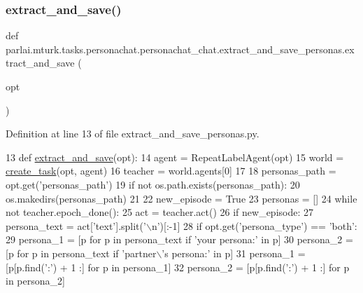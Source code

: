 \subsubsection{\texorpdfstring{extract\+\_\+and\+\_\+save()}{extract\_and\_save()}}
{\footnotesize\ttfamily def parlai.\+mturk.\+tasks.\+personachat.\+personachat\+\_\+chat.\+extract\+\_\+and\+\_\+save\+\_\+personas.\+extract\+\_\+and\+\_\+save (\begin{DoxyParamCaption}\item[{}]{opt }\end{DoxyParamCaption})}



Definition at line 13 of file extract\+\_\+and\+\_\+save\+\_\+personas.\+py.


\begin{DoxyCode}
13 \textcolor{keyword}{def }\hyperlink{namespacepersonachat__eval_1_1extract__and__save__personas_a7bae99c34a0b3f49cbce1328146926fd}{extract\_and\_save}(opt):
14     agent = RepeatLabelAgent(opt)
15     world = \hyperlink{namespaceparlai_1_1core_1_1worlds_a11923c10b545c7ecc1b08fe2242d9c2c}{create\_task}(opt, agent)
16     teacher = world.agents[0]
17 
18     personas\_path = opt.get(\textcolor{stringliteral}{'personas\_path'})
19     \textcolor{keywordflow}{if} \textcolor{keywordflow}{not} os.path.exists(personas\_path):
20         os.makedirs(personas\_path)
21 
22     new\_episode = \textcolor{keyword}{True}
23     personas = []
24     \textcolor{keywordflow}{while} \textcolor{keywordflow}{not} teacher.epoch\_done():
25         act = teacher.act()
26         \textcolor{keywordflow}{if} new\_episode:
27             persona\_text = act[\textcolor{stringliteral}{'text'}].split(\textcolor{stringliteral}{'\(\backslash\)n'})[:-1]
28             \textcolor{keywordflow}{if} opt.get(\textcolor{stringliteral}{'persona\_type'}) == \textcolor{stringliteral}{'both'}:
29                 persona\_1 = [p \textcolor{keywordflow}{for} p \textcolor{keywordflow}{in} persona\_text \textcolor{keywordflow}{if} \textcolor{stringliteral}{'your persona:'} \textcolor{keywordflow}{in} p]
30                 persona\_2 = [p \textcolor{keywordflow}{for} p \textcolor{keywordflow}{in} persona\_text \textcolor{keywordflow}{if} \textcolor{stringliteral}{'partner\(\backslash\)'s persona:'} \textcolor{keywordflow}{in} p]
31                 persona\_1 = [p[p.find(\textcolor{stringliteral}{':'}) + 1 :] \textcolor{keywordflow}{for} p \textcolor{keywordflow}{in} persona\_1]
32                 persona\_2 = [p[p.find(\textcolor{stringliteral}{':'}) + 1 :] \textcolor{keywordflow}{for} p \textcolor{keywordflow}{in} persona\_2]

\end{DoxyCode}
